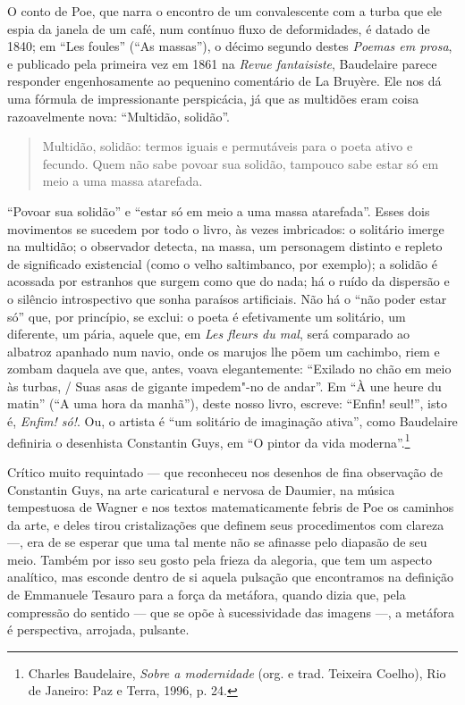 O conto de Poe, que narra o encontro de um convalescente com a turba que
ele espia da janela de um café, num contínuo fluxo de deformidades, é
datado de 1840; em “Les foules” (“As massas”), o décimo segundo destes
\textit{Poemas em prosa}, e publicado pela primeira vez em 1861 na
\textit{Revue fantaisiste}, Baudelaire parece responder engenhosamente
ao pequenino comentário de La Bruyère. Ele nos dá uma fórmula de
impressionante perspicácia, já que as multidões eram coisa
razoavelmente nova: “Multidão, solidão”. 

\begin{quote}
Multidão, solidão: termos iguais e permutáveis para o poeta ativo e
fecundo. Quem não sabe povoar sua solidão, tampouco sabe estar só em
meio a uma massa atarefada.
\end{quote}

“Povoar sua solidão” e “estar só em meio a uma massa atarefada”. Esses
dois movimentos se sucedem por todo o livro, às vezes imbricados: o
solitário imerge na multidão; o observador detecta, na massa, um
personagem distinto e repleto de significado existencial (como o velho
saltimbanco, por exemplo); a solidão é acossada por estranhos que
surgem como que do nada; há o ruído da dispersão e o silêncio
introspectivo que sonha paraísos artificiais. Não há o “não poder estar
só” que, por princípio, se exclui: o poeta é efetivamente um solitário,
um diferente, um pária, aquele que, em \textit{Les fleurs du mal}, será
comparado ao albatroz apanhado num navio, onde os marujos lhe põem um
cachimbo, riem e zombam daquela ave que, antes, voava elegantemente:
“Exilado no chão em meio às turbas, / Suas asas de gigante impedem"-no
de andar”. Em “À une heure du matin” (“A uma hora da manhã”), deste
nosso livro, escreve: “Enfin! seul!”, isto é, \textit{Enfim! só!}. Ou,
o artista é “um solitário de imaginação ativa”, como Baudelaire
definiria o desenhista Constantin Guys, em “O pintor da vida
moderna”.\footnote{ Charles Baudelaire, \textit{Sobre a modernidade}
(org. e trad. Teixeira Coelho), Rio de Janeiro: Paz e
Terra, 1996, p. 24.}

Crítico muito requintado --- que reconheceu nos desenhos de fina
observação de Constantin Guys, na arte caricatural e nervosa de
Daumier, na música tempestuosa de Wagner e nos textos matematicamente
febris de Poe os caminhos da arte, e deles tirou cristalizações que
definem seus procedimentos com clareza ---, era de se esperar que uma tal
mente não se afinasse pelo diapasão de seu meio. Também por isso seu
gosto pela frieza da alegoria, que tem um aspecto analítico, mas
esconde dentro de si aquela pulsação que encontramos na definição de
Emmanuele Tesauro para a força da metáfora, quando dizia que, pela
compressão do sentido --- que se opõe à sucessividade das imagens ---, a
metáfora é perspectiva, arrojada, pulsante.

